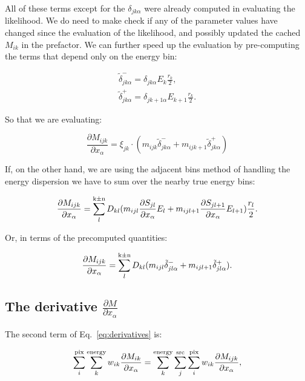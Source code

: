 \documentclass[preprint]{aastex}
\begin{document}
\noindent All of these terms except for the $\delta_{jk\alpha}$ were
already computed in evaluating the likelihood.  We do need to make
check if any of the parameter values have changed since the evaluation
of the likelihood, and possibly updated the cached $M_{ik}$ in the 
prefactor.   We can further speed up the evaluation by pre-computing the terms
that depend only on the energy bin:

\begin{eqnarray}
  \tilde{\delta}_{jk\alpha}^{-} = \delta_{jk\alpha} E_k \frac{r_k}{2}, \nonumber \\
  \tilde{\delta}_{jk\alpha}^{+} = \delta_{jk+1\alpha} E_{k+1} \frac{r_k}{2}.
\end{eqnarray}

\noindent So that we are evaluating:

\begin{equation}
  \frac{\partial M_{ijk}}{\partial x_{\alpha}} = \xi_{jk} \cdot (m_{ijk} \tilde{\delta}_{jk\alpha}^{-} +  m_{ijk+1} \tilde{\delta}_{jk\alpha}^{+})
\end{equation}

If, on the other hand, we are using the adjacent bins method of handling the energy dispersion we have 
to sum over the nearby true energy bins:

\begin{equation}
  \frac{\partial M_{ijk}}{\partial x_{\alpha}} =  \sum_l^{\rm k\pm n} D_{kl} (m_{ijl} \frac{\partial S_{jl}}{\partial x_{\alpha}} E_l +  m_{ijl+1} \frac{\partial S_{jl+1}}{\partial x_{\alpha}} E_{l+1}) \frac{r_l}{2}.
\end{equation}

\noindent Or, in terms of the precomputed quantities:

\begin{equation}
  \frac{\partial M_{ijk}}{\partial x_{\alpha}} =  \sum_l^{\rm k\pm n} D_{kl} (m_{ijl} \tilde{\delta}_{jl\alpha}^{-} +  m_{ijl+1} \tilde{\delta}_{jl\alpha}^{+} ).
\end{equation}



\subsection{The derivative \texorpdfstring{$\frac{\partial M}{\partial x_{\alpha}}$}{dM/dx}}\label{subsec:derivatives_part2}

The second term of Eq.~\ref{eq:derivatives} is:

\begin{equation}
  \sum_i^{\rm pix} \sum_k^{\rm energy} w_{ik}\frac{\partial M_{ik}}{\partial x_{\alpha}} = 
  \sum_k^{\rm energy} \sum_j^{\rm src} \sum_i^{\rm pix} w_{ik} \frac{\partial M_{ijk}}{\partial x_{\alpha}},
\end{equation}
\end{document}
